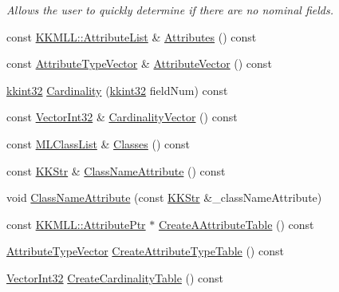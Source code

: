 \begin{DoxyCompactItemize}
\begin{DoxyCompactList}\small\item\em Allows the user to quickly determine if there are no nominal fields. \end{DoxyCompactList}\item 
const \hyperlink{class_k_k_m_l_l_1_1_attribute_list}{K\+K\+M\+L\+L\+::\+Attribute\+List} \& \hyperlink{class_k_k_m_l_l_1_1_file_desc_ae07aab5d923f4c6bc38de38f1d2b2409}{Attributes} () const 
\item 
const \hyperlink{class_k_k_m_l_l_1_1_attribute_type_vector}{Attribute\+Type\+Vector} \& \hyperlink{class_k_k_m_l_l_1_1_file_desc_a6dc24b4d315f0c314a4c735d0165798b}{Attribute\+Vector} () const 
\item 
\hyperlink{namespace_k_k_b_a8fa4952cc84fda1de4bec1fbdd8d5b1b}{kkint32} \hyperlink{class_k_k_m_l_l_1_1_file_desc_a58a548ebb87bfc265d05208871390f54}{Cardinality} (\hyperlink{namespace_k_k_b_a8fa4952cc84fda1de4bec1fbdd8d5b1b}{kkint32} field\+Num) const 
\item 
const \hyperlink{namespace_k_k_b_adf8a10085d231870d8a072046d6cba10}{Vector\+Int32} \& \hyperlink{class_k_k_m_l_l_1_1_file_desc_a1220ac7417528c460b5c9041275e4c7f}{Cardinality\+Vector} () const 
\item 
const \hyperlink{class_k_k_m_l_l_1_1_m_l_class_list}{M\+L\+Class\+List} \& \hyperlink{class_k_k_m_l_l_1_1_file_desc_a51aa1aa01ffbfb47e208d2a9695e7ad5}{Classes} () const 
\item 
const \hyperlink{class_k_k_b_1_1_k_k_str}{K\+K\+Str} \& \hyperlink{class_k_k_m_l_l_1_1_file_desc_ab5923982e34cb29369ab4bad36ce342a}{Class\+Name\+Attribute} () const 
\item 
void \hyperlink{class_k_k_m_l_l_1_1_file_desc_a4df57d86b704e5e06c118556e44df38b}{Class\+Name\+Attribute} (const \hyperlink{class_k_k_b_1_1_k_k_str}{K\+K\+Str} \&\+\_\+class\+Name\+Attribute)
\item 
const \hyperlink{namespace_k_k_m_l_l_a7bf3ea66cacd9dddc58369800cbc93b6}{K\+K\+M\+L\+L\+::\+Attribute\+Ptr} $\ast$ \hyperlink{class_k_k_m_l_l_1_1_file_desc_ab06cc9c9bd6ef17e487d5760ab4ff5f7}{Create\+A\+Attribute\+Table} () const 
\item 
\hyperlink{class_k_k_m_l_l_1_1_attribute_type_vector}{Attribute\+Type\+Vector} \hyperlink{class_k_k_m_l_l_1_1_file_desc_a924736ac68c054c64001fe836ba7c1e3}{Create\+Attribute\+Type\+Table} () const 
\item 
\hyperlink{namespace_k_k_b_adf8a10085d231870d8a072046d6cba10}{Vector\+Int32} \hyperlink{class_k_k_m_l_l_1_1_file_desc_a1f16b3ad912b04745baa9eea8d3111c7}{Create\+Cardinality\+Table} () const 

\end{DoxyCompactItemize}
